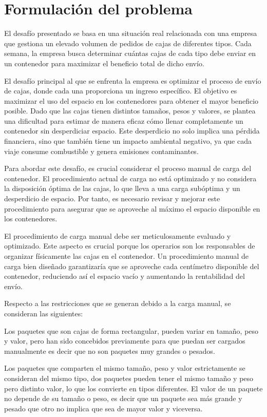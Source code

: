\section{Formulación del problema}

El desafío presentado se basa en una situación real relacionada con una empresa que gestiona un elevado volumen de pedidos de cajas de diferentes tipos. Cada semana, la empresa busca determinar cuántas cajas de cada tipo debe enviar en un contenedor para maximizar el beneficio total de dicho envío.

El desafío principal al que se enfrenta la empresa es optimizar el proceso de envío de cajas, donde cada una proporciona un ingreso específico. El objetivo es maximizar el uso del espacio en los contenedores para obtener el mayor beneficio posible. Dado que las cajas tienen distintos tamaños, pesos y valores, se plantea una dificultad para estimar de manera eficaz cómo llenar completamente un contenedor sin desperdiciar espacio. Este desperdicio no solo implica una pérdida financiera, sino que también tiene un impacto ambiental negativo, ya que cada viaje consume combustible y genera emisiones contaminantes.

Para abordar este desafío, es crucial considerar el proceso manual de carga del contenedor. El procedimiento actual de carga no está optimizado y no considera la disposición óptima de las cajas, lo que lleva a una carga subóptima y un desperdicio de espacio. Por tanto, es necesario revisar y mejorar este procedimiento para asegurar que se aproveche al máximo el espacio disponible en los contenedores.

El procedimiento de carga manual debe ser meticulosamente evaluado y optimizado. Este aspecto es crucial porque los operarios son los responsables de organizar físicamente las cajas en el contenedor. Un procedimiento manual de carga bien diseñado garantizaría que se aproveche cada centímetro disponible del contenedor, reduciendo así el espacio vacío y aumentando la rentabilidad del envío.

Respecto a las restricciones que se generan debido a la carga manual, se consideran las siguientes:

Los paquetes que son cajas de forma rectangular, pueden variar en tamaño, peso y valor, pero han sido concebidos previamente para que puedan ser cargados manualmente es decir que no son paquetes muy grandes o pesados.

Los paquetes que comparten el mismo tamaño, peso y valor estrictamente se consideran del mismo tipo, dos paquetes pueden tener el mismo tamaño y peso pero distinto valor, lo que los convierte en tipos diferentes. El valor de un paquete no depende de su tamaño o peso, es decir que un paquete sea más grande y pesado que otro no implica que sea de mayor valor y viceversa.

